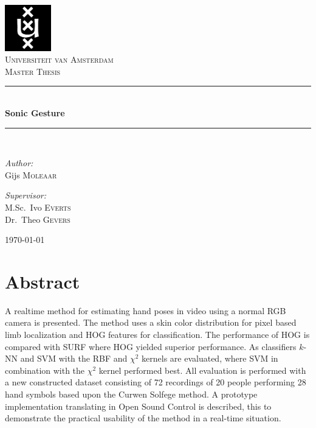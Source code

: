 \documentclass[a4paper, 11pt]{book}
\newcommand{\HRule}{\rule{\linewidth}{0.5mm}}
\begin{document}
\thispagestyle{empty}

\begin{titlepage}
\begin{center}

\includegraphics[width=0.15\textwidth]{./figures/uva.png}\\[1cm]
\textsc{\LARGE Universiteit van Amsterdam}\\[1.5cm]
\textsc{\Large Master Thesis}\\[0.5cm]

\HRule \\[0.4cm]
{ \huge \bfseries Sonic Gesture}\\[0.4cm]

\HRule \\[1.5cm]

\begin{minipage}{0.4\textwidth}
\begin{flushleft} \large
\emph{Author:}\\
Gijs \textsc{Moleaar}
\end{flushleft}
\end{minipage}
\begin{minipage}{0.4\textwidth}
\begin{flushright} \large
\emph{Supervisor:} \\
M.Sc.~Ivo \textsc{Everts} \\
Dr.~Theo \textsc{Gevers}
\end{flushright}
\end{minipage}

\vfill

{\large \today}

\end{center}
\end{titlepage}



\chapter*{Abstract}
A real\-time method for estimating hand poses in video using a normal RGB camera is presented. The method uses a skin color distribution for pixel based limb localization and HOG features for classification. The performance of HOG is compared with SURF where HOG yielded superior performance. As classifiers $k$-NN and SVM with the RBF and $\chi^2$ kernels are evaluated, where SVM in combination with the $\chi^2$ kernel performed best. All evaluation is performed with a new constructed dataset consisting of 72 recordings of 20 people performing 28 hand symbols based upon the Curwen Solfege method. A prototype implementation translating in Open Sound Control is described, this to demonstrate the practical usability of the method in a real-time situation.
\end{document}
